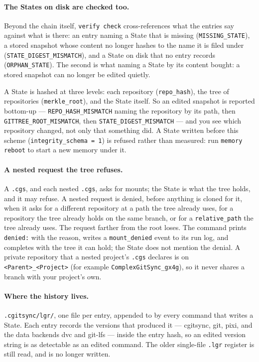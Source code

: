 \paragraph{The States on disk are checked too.} Beyond the chain itself,
\texttt{verify check} cross-references what the entries say against what is
there: an entry naming a State that is missing (\texttt{MISSING\_STATE}), a
stored snapshot whose content no longer hashes to the name it is filed
under (\texttt{STATE\_DIGEST\_MISMATCH}), and a State on disk that no entry
records (\texttt{ORPHAN\_STATE}). The second is what naming a State by its
content bought: a stored snapshot can no longer be edited quietly.

A State is hashed at three levels: each repository (\texttt{repo\_hash}),
the tree of repositories (\texttt{merkle\_root}), and the State itself. So an
edited snapshot is reported bottom-up --- \texttt{REPO\_HASH\_MISMATCH} naming
the repository by its path, then \texttt{GITTREE\_ROOT\_MISMATCH}, then
\texttt{STATE\_DIGEST\_MISMATCH} --- and you see which repository changed, not
only that something did. A State written before this scheme
(\texttt{integrity\_schema = 1}) is refused rather than measured: run
\texttt{memory reboot} to start a new memory under it.

\paragraph{A nested request the tree refuses.} A \texttt{.cgs}, and each nested
\texttt{.cgs}, asks for mounts; the State is what the tree holds, and it may
refuse. A nested request is denied, before anything is cloned for it, when it
asks for a different repository at a path the tree already uses, for a
repository the tree already holds on the same branch, or for a
\texttt{relative\_path} the tree already uses. The request farther from the
root loses. The command prints \texttt{denied:} with the reason, writes a
\texttt{mount\_denied} event to its run log, and completes with the tree it can
hold; the State does not mention the denial. A private repository that a
nested project's \texttt{.cgs} declares is on
\texttt{<Parent>\_<Project>} (for example \texttt{ComplexGitSync\_gx4g}), so it
never shares a branch with your project's own.

\paragraph{Where the history lives.} \texttt{.cgitsync/lgr/}, one file per
entry, appended to by every command that writes a State. Each entry records
the versions that produced it --- cgitsync, git, pixi, and the data backends
dvc and git-lfs --- inside the entry hash, so an edited version string is as
detectable as an edited command. The older single-file \texttt{.lgr}
register is still read, and is no longer written.

